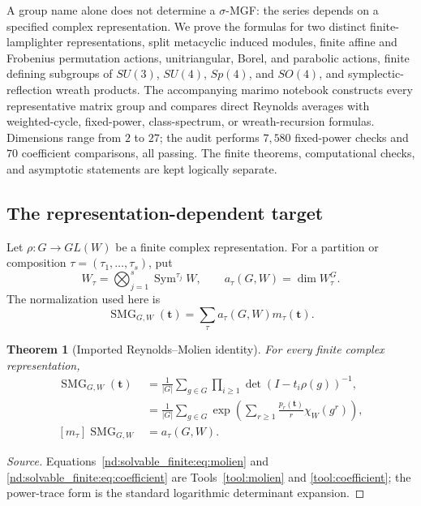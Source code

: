 \documentclass[10pt]{article}
\newcommand{\Sym}{\operatorname{Sym}}
\newcommand{\SMG}{\operatorname{SMG}}
\newcommand{\MGF}{\SMG}
\newtheorem{theorem}{Theorem}
\begin{document}
A group name alone does not determine a $\sigma$-MGF: the series depends on a
specified complex representation.  We prove the formulas for two distinct
finite-lamplighter representations, split metacyclic induced modules, finite
affine and Frobenius permutation actions, unitriangular, Borel, and parabolic
actions, finite defining subgroups of $SU(3)$, $SU(4)$, $Sp(4)$, and $SO(4)$,
and symplectic-reflection wreath products.  The accompanying marimo notebook
constructs every representative matrix group and compares direct Reynolds
averages with weighted-cycle, fixed-power, class-spectrum, or wreath-recursion
formulas.  Dimensions range from $2$ to $27$; the audit performs $7{,}580$
fixed-power checks and $70$ coefficient comparisons, all passing.  The finite
theorems, computational checks, and asymptotic statements are kept logically
separate.

\subsection{The representation-dependent target}

Let $\rho:G\to GL(W)$ be a finite complex representation.  For a partition
or composition $\tau=(\tau_1,\ldots,\tau_s)$, put
\[
 W_\tau=\bigotimes_{j=1}^s\Sym^{\tau_j}W,
 \qquad
 a_\tau(G,W)=\dim W_\tau^G.
\]
The normalization used here is
\[
 \MGF_{G,W}(\mathbf t)=\sum_\tau a_\tau(G,W)m_\tau(\mathbf t).
\]

\begin{theorem}[Imported Reynolds--Molien identity]\label{nd:solvable_finite:thm:universal}
For every finite complex representation,
\begin{align}
 \MGF_{G,W}(\mathbf t)
 &=\frac1{|G|}\sum_{g\in G}\prod_{i\geq1}
       \det(I-t_i\rho(g))^{-1},\label{nd:solvable_finite:eq:molien}\\
 &=\frac1{|G|}\sum_{g\in G}
 \exp\!\left(\sum_{r\geq1}\frac{p_r(\mathbf t)}r\chi_W(g^r)\right),
 \label{nd:solvable_finite:eq:power-trace}\\
 [m_\tau]\MGF_{G,W}&=a_\tau(G,W).\label{nd:solvable_finite:eq:coefficient}
\end{align}
\end{theorem}

\begin{proof}[Source]
Equations~\eqref{nd:solvable_finite:eq:molien} and
\eqref{nd:solvable_finite:eq:coefficient} are Tools~\ref{tool:molien} and
\ref{tool:coefficient}; the power-trace form is the standard logarithmic
determinant expansion.
\end{proof}
\end{document}

